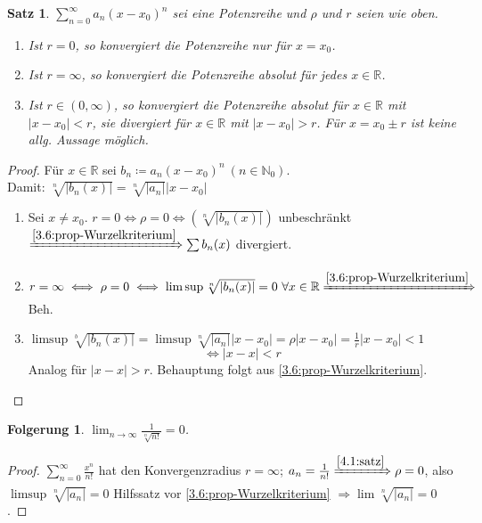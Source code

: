 \documentclass{extreport}
\newcommand{\N}{\mathbb{N}}
\newcommand{\R}{\mathbb{R}}
\theoremstyle{named}
\theoremstyle{dotless}
\newtheorem{satz}[namedtheorem]{Satz}
\newtheorem*{folgerung*}{Folgerung}
\begin{document}
\begin{satz} \label{4.1:satz}
	$\sum_{n=0}^{\infty} a_{n} (x - x_{0})^{n}$ sei eine Potenzreihe und $\rho$ und $r$ seien wie oben.
	\begin{enumerate}
		\item Ist $r = 0$, so konvergiert die Potenzreihe nur für $x = x_{0}$.
		\item Ist $r = \infty$, so konvergiert die Potenzreihe absolut für jedes $x \in \R$.
		\item Ist $r \in (0, \infty)$, so konvergiert die Potenzreihe absolut für $x \in \R$ mit $|x - x_{0}| < r$, sie divergiert für $x \in \R$ mit $|x - x_{0}| > r$. Für $x = x_{0} \pm r$ ist keine allg. Aussage möglich.
	\end{enumerate}
\end{satz}

\begin{proof}
	Für $x \in \R$ sei $b_{n} \coloneqq a_{n} (x - x_{0})^{n} ~(n \in \N_{0})$. \\
	Damit: $\sqrt[n]{|b_{n}(x)|} = \sqrt[n]{|a_{n}|} |x - x_{0}|$
	\begin{enumerate}
		\item Sei $x \neq x_{0}$. $r = 0 \iff \rho = 0 \iff \left( \sqrt[n]{|b_{n}(x)|} \right)$ unbeschränkt $\xRightarrow[]{\ref{3.6:prop-Wurzelkriterium}} \sum b_{n}(x)$ divergiert.
		\item $r = \infty \iff \rho = 0 \iff \limsup \sqrt[n]{|b_{n}(x)|} = 0 ~\forall x \in \R \xRightarrow[]{\ref{3.6:prop-Wurzelkriterium}}$ Beh.
		\item $\limsup \sqrt[b]{|b_{n}(x)|} = \limsup \sqrt[n]{|a_{n}|} |x - x_{0}| = \rho |x - x_{0}| = \frac{1}{r} |x - x_{0}| < 1$ 
			$$ \iff |x - x| < r $$
			Analog für $|x - x| > r$. Behauptung folgt aus \ref{3.6:prop-Wurzelkriterium}.
	\end{enumerate}	
\end{proof}


\begin{folgerung*}
	$\lim_{n \rightarrow \infty} \frac{1}{\sqrt[n]{n!}} = 0$.	
\end{folgerung*}

\begin{proof}
	$\sum_{n=0}^{\infty} \frac{x^{n}}{n!}$ hat den Konvergenzradius $r = \infty$; $a_{n} = \frac{1}{n!} \xRightarrow[]{\ref{4.1:satz}} \rho = 0$, also $\limsup \sqrt[n]{|a_{n}|} = 0$ Hilfssatz vor \ref{3.6:prop-Wurzelkriterium} $\Rightarrow \lim \sqrt[n]{|a_{n}|} = 0$.
\end{proof}
\end{document}
